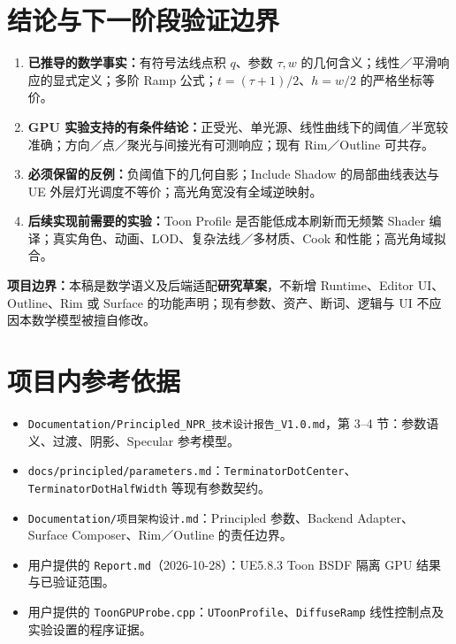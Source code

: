 \documentclass[UTF8,11pt,a4paper]{ctexart}
\numberwithin{equation}{section}
\begin{document}
\section{结论与下一阶段验证边界}
\begin{enumerate}[leftmargin=2.5em]
\item \textbf{已推导的数学事实：}有符号法线点积 $q$、参数 $\tau,w$ 的几何含义；线性／平滑响应的显式定义；多阶 Ramp 公式；$t=(\tau+1)/2$、$h=w/2$ 的严格坐标等价。
\item \textbf{GPU 实验支持的有条件结论：}正受光、单光源、线性曲线下的阈值／半宽较准确；方向／点／聚光与间接光有可测响应；现有 Rim／Outline 可共存。
\item \textbf{必须保留的反例：}负阈值下的几何自影；Include Shadow 的局部曲线表达与 UE 外层灯光调度不等价；高光角宽没有全域逆映射。
\item \textbf{后续实现前需要的实验：}Toon Profile 是否能低成本刷新而无频繁 Shader 编译；真实角色、动画、LOD、复杂法线／多材质、Cook 和性能；高光角域拟合。
\end{enumerate}

\noindent\textbf{项目边界：}本稿是数学语义及后端适配\textbf{研究草案}，不新增 Runtime、Editor UI、Outline、Rim 或 Surface 的功能声明；现有参数、资产、断词、逻辑与 UI 不应因本数学模型被擅自修改。

\section*{项目内参考依据}
\begin{itemize}
\item \texttt{Documentation/Principled\_NPR\_技术设计报告\_V1.0.md}，第 3--4 节：参数语义、过渡、阴影、Specular 参考模型。
\item \texttt{docs/principled/parameters.md}：\texttt{TerminatorDotCenter}、\texttt{TerminatorDotHalfWidth} 等现有参数契约。
\item \texttt{Documentation/项目架构设计.md}：Principled 参数、Backend Adapter、Surface Composer、Rim／Outline 的责任边界。
\item 用户提供的 \texttt{Report.md}（2026-10-28）：UE5.8.3 Toon BSDF 隔离 GPU 结果与已验证范围。
\item 用户提供的 \texttt{ToonGPUProbe.cpp}：\texttt{UToonProfile}、\texttt{DiffuseRamp} 线性控制点及实验设置的程序证据。
\end{itemize}
\end{document}
